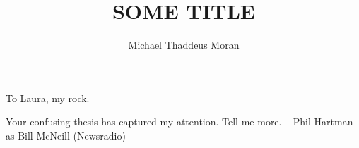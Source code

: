 \documentclass[final, twoadvisors]{nddiss2e}
\begin{document}
\frontmatter

\title{SOME TITLE}
\author{Michael Thaddeus Moran}

\maketitle



\begin{dedication}
To Laura, my rock.
\end{dedication}

\tableofcontents
\listoffigures
\listoftables

% 

\begin{dedication}
Your confusing thesis has captured my attention. Tell me more.
\newline\---{} Phil Hartman as Bill McNeill (Newsradio)
\end{dedication}

\mainmatter







\appendix





\backmatter



\end{document}
